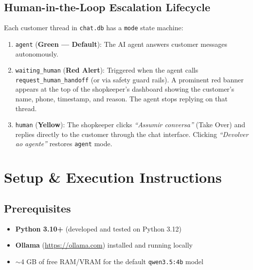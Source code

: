 \documentclass[11pt,a4paper]{article}
\begin{document}
\subsection{Human-in-the-Loop Escalation Lifecycle}
Each customer thread in \texttt{chat.db} has a \texttt{mode} state machine:
\begin{enumerate}
    \item \texttt{agent} (\textbf{Green --- Default}): The AI agent answers customer messages autonomously.
    \item \texttt{waiting\_human} (\textbf{\textcolor{alertred}{Red Alert}}): Triggered when the agent calls \texttt{request\_human\_handoff} (or via safety guard rails). A prominent red banner appears at the top of the shopkeeper's dashboard showing the customer's name, phone, timestamp, and reason. The agent stops replying on that thread.
    \item \texttt{human} (\textbf{Yellow}): The shopkeeper clicks \textit{``Assumir conversa''} (Take Over) and replies directly to the customer through the chat interface. Clicking \textit{``Devolver ao agente''} restores \texttt{agent} mode.
\end{enumerate}

\section{Setup \& Execution Instructions}

\subsection{Prerequisites}
\begin{itemize}
    \item \textbf{Python 3.10+} (developed and tested on Python 3.12)
    \item \textbf{Ollama} (\url{https://ollama.com}) installed and running locally
    \item $\sim$4 GB of free RAM/VRAM for the default \texttt{qwen3.5:4b} model
\end{itemize}
\end{document}
